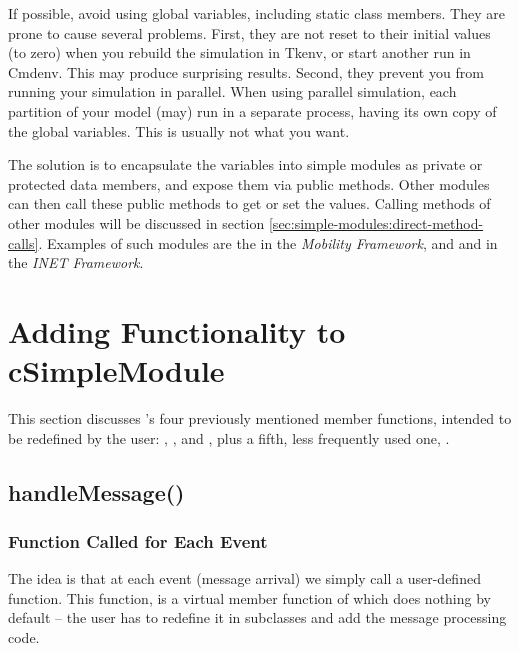 If possible, avoid using global variables, including
static class members. They are prone to cause several problems.
First, they are not reset to their initial values (to zero)
when you rebuild the simulation in Tkenv, or start another run
in Cmdenv. This may produce surprising results.
Second, they prevent you from running your simulation in parallel.
When using parallel simulation, each partition of your model
(may) run in a separate process, having its own copy of the
global variables. This is usually not what you want.

The solution is to encapsulate the variables into simple modules
as private or protected data members, and expose them via public methods.
Other modules can then call these public methods to get or set the values.
Calling methods of other modules will be discussed in section
\ref{sec:simple-modules:direct-method-calls}.
Examples of such modules are the  in the \textit{Mobility Framework},
and  and  in the \textit{INET Framework}.



\section{Adding Functionality to cSimpleModule}
\label{sec:simple-modules:adding-functionality-to-csimplemodule}

This section discusses 's four previously
mentioned member functions, intended to be redefined by the user:
, , 
and , plus a fifth, less frequently used one,
.



\subsection{handleMessage()}
\label{sec:simple-modules:handlemessage}

\subsubsection{Function Called for Each Event}


The idea is that at each event (message arrival) we
simply call a user-defined function. This function,
 is a
virtual member function of  which does
nothing by default -- the user has to redefine it in subclasses
and add the message processing code.

